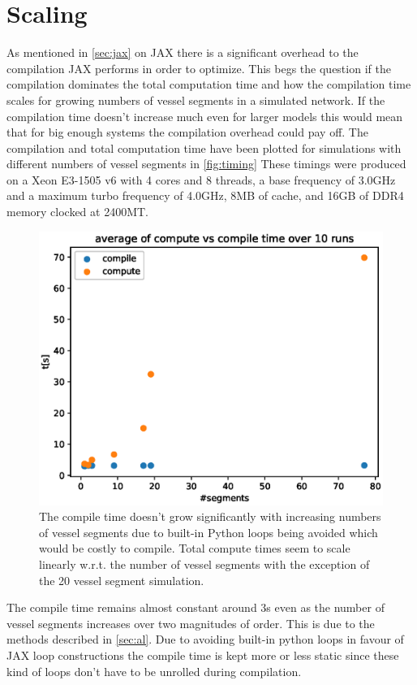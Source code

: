 \documentclass[a4paper, oneside]{discothesis}
\begin{document}
\section{Scaling} \label{sec:sc}
As mentioned in \autoref{sec:jax} on JAX there is a significant overhead to the compilation JAX performs in order to optimize.
This begs the question if the compilation dominates the total computation time and how the compilation time scales for growing numbers of vessel segments in a simulated network.
If the compilation time doesn't increase much even for larger models this would mean that for big enough systems the compilation overhead could pay off.
The compilation and total computation time have been plotted for simulations with different numbers of vessel segments in \autoref{fig:timing}
These timings were produced on a Xeon E3-1505 v6 with 4 cores and 8 threads, a base frequency of 3.0GHz and a maximum turbo frequency of 4.0GHz, 8MB of cache, and 16GB of DDR4 memory clocked at 2400MT.
\begin{figure} [!ht]
	\centering
	\includegraphics[width=0.8\columnwidth]{figures/timing.eps}
	\caption{The compile time doesn't grow significantly with increasing numbers of vessel segments due to built-in Python loops being avoided which would be costly to compile. Total compute times seem to scale linearly w.r.t. the number of vessel segments with the exception of the 20 vessel segment simulation.}
	\label{fig:timing}
\end{figure}
The compile time remains almost constant around 3s even as the number of vessel segments increases over two magnitudes of order.
This is due to the methods described in \autoref{sec:al}.
Due to avoiding built-in python loops in favour of JAX loop constructions the compile time is kept more or less static since these kind of loops don't have to be unrolled during compilation.
\end{document}
